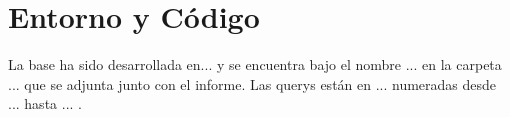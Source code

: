 \section{Entorno y Código}

La base ha sido desarrollada en... y se encuentra bajo el nombre ... en la carpeta ... que se adjunta junto con el informe. Las querys están en ... numeradas desde ... hasta ... . 